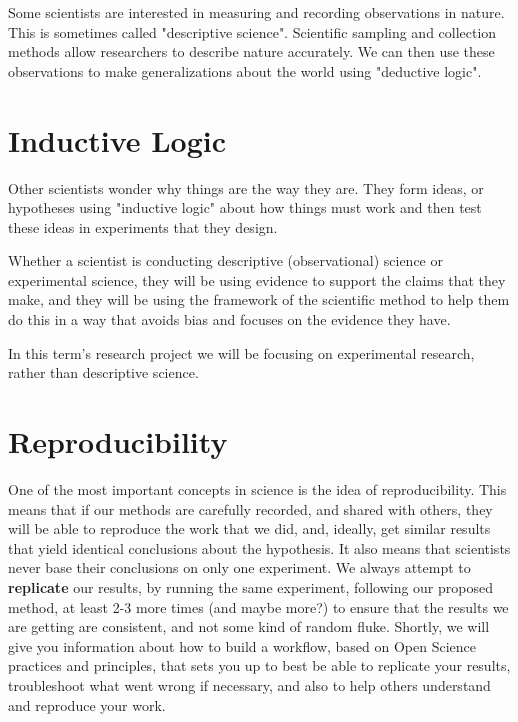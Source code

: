 \documentclass[
]{book}
\begin{document}
Some scientists are interested in measuring and recording observations in nature. This is sometimes called "descriptive science". Scientific sampling and collection methods allow researchers to describe nature accurately. We can then use these observations to make generalizations about the world using "deductive logic".

\hypertarget{inductive-logic}{%
\section*{Inductive Logic}\label{inductive-logic}}

Other scientists wonder why things are the way they are. They form ideas, or hypotheses using "inductive logic" about how things must work and then test these ideas in experiments that they design.

Whether a scientist is conducting descriptive (observational) science or experimental science, they will be using evidence to support the claims that they make, and they will be using the framework of the scientific method to help them do this in a way that avoids bias and focuses on the evidence they have.

In this term's research project we will be focusing on experimental research, rather than descriptive science.

\hypertarget{reproducibility}{%
\section*{Reproducibility}\label{reproducibility}}

One of the most important concepts in science is the idea of reproducibility. This means that if our methods are carefully recorded, and shared with others, they will be able to reproduce the work that we did, and, ideally, get similar results that yield identical conclusions about the hypothesis. It also means that scientists never base their conclusions on only one experiment. We always attempt to \textbf{replicate} our results, by running the same experiment, following our proposed method, at least 2-3 more times (and maybe more?) to ensure that the results we are getting are consistent, and not some kind of random fluke. Shortly, we will give you information about how to build a workflow, based on Open Science practices and principles, that sets you up to best be able to replicate your results, troubleshoot what went wrong if necessary, and also to help others understand and reproduce your work.
\end{document}
